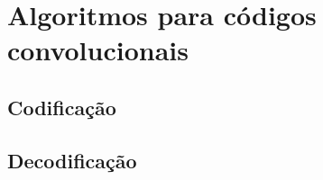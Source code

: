 \section{Algoritmos para códigos convolucionais}
%
%
%
%
\subsection{Codificação}
%
%
%
\subsection{Decodificação}

